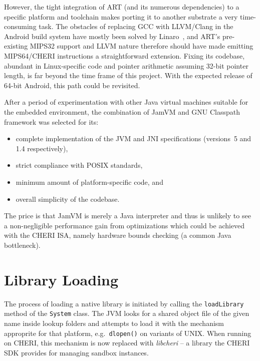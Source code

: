 \documentclass[a4paper,12pt,twoside,openright]{report}
\newcommand{\class}[1]{\texttt{#1}}
\newcommand{\tool}[1]{\emph{#1}}
\newcommand{\lib}[1]{\tool{lib#1}}
\begin{document}
However, the tight integration of ART (and its numerous dependencies) to a specific platform and toolchain makes porting it to another substrate a very time-consuming task. The obstacles of replacing GCC with LLVM{\slash}Clang in the Android build system have mostly been solved by Linaro~\cite{Linaro:AndroidWithClang}, and ART's pre-existing MIPS32 support and LLVM nature therefore should have made emitting MIPS64/CHERI instructions a straightforward extension. Fixing its codebase, abundant in Linux-specific code and pointer arithmetic assuming 32-bit pointer length, is far beyond the time frame of this project. With the expected release of 64-bit Android, this path could be revisited.

After a period of experimentation with other Java virtual machines suitable for the embedded environment, the combination of JamVM and GNU Classpath framework was selected for its:
\begin{itemize}
\item complete implementation of the JVM and JNI specifications (versions~5 and 1.4 respectively),
\item strict compliance with POSIX standards,
\item minimum amount of platform-specific code, and
\item overall simplicity of the codebase.
\end{itemize}
The price is that JamVM is merely a Java interpreter and thus is unlikely to see a non-negligible performance gain from optimizations which could be achieved with the CHERI ISA, namely hardware bounds checking (a common Java bottleneck).

\section{Library Loading}

The process of loading a native library is initiated by calling the \texttt{loadLibrary} method of the \class{System} class. The JVM looks for a shared object file of the given name inside lookup folders and attempts to load it with the mechanism approprite for that platform, e.g.\ \texttt{dlopen()} on variants of UNIX. When running on CHERI, this mechanism is now replaced with \lib{cheri} -- a library the CHERI SDK provides for managing sandbox instances. 
\end{document}
